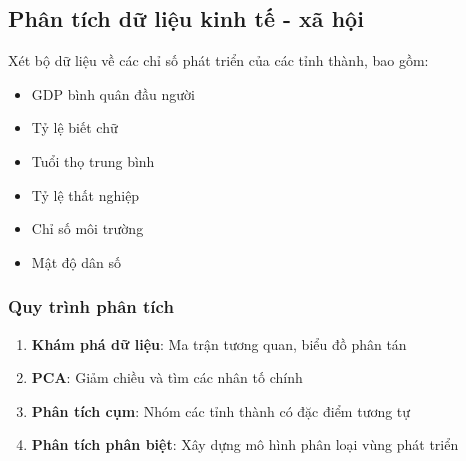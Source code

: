 \subsection{Phân tích dữ liệu kinh tế - xã hội}
Xét bộ dữ liệu về các chỉ số phát triển của các tỉnh thành, bao gồm:
\begin{itemize}
    \item GDP bình quân đầu người
    \item Tỷ lệ biết chữ
    \item Tuổi thọ trung bình
    \item Tỷ lệ thất nghiệp
    \item Chỉ số môi trường
    \item Mật độ dân số
\end{itemize}

\subsubsection*{Quy trình phân tích}
\begin{enumerate}
    \item \textbf{Khám phá dữ liệu}: Ma trận tương quan, biểu đồ phân tán
    \item \textbf{PCA}: Giảm chiều và tìm các nhân tố chính
    \item \textbf{Phân tích cụm}: Nhóm các tỉnh thành có đặc điểm tương tự
    \item \textbf{Phân tích phân biệt}: Xây dựng mô hình phân loại vùng phát triển
\end{enumerate}

